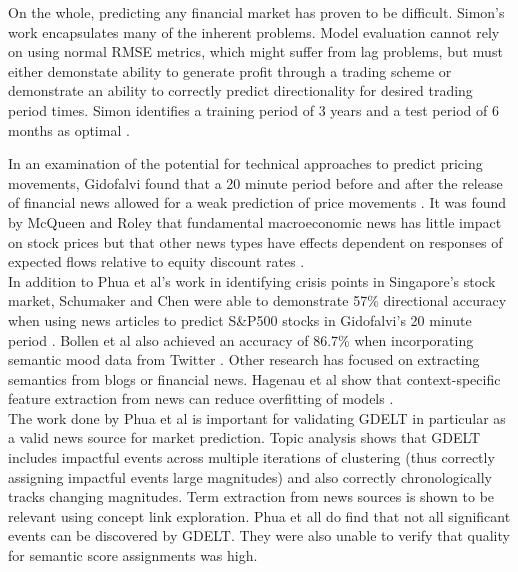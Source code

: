 On the whole, predicting any financial market has proven to be difficult. Simon's work encapsulates many of the inherent problems. Model evaluation cannot rely on using normal RMSE metrics, which might suffer from lag problems, but must either demonstate ability to generate profit through a trading scheme or demonstrate an ability to correctly predict directionality for desired trading period times. Simon identifies a training period of 3 years and a test period of 6 months as optimal \cite{forex_neuralnets}.

\noindent In an examination of the potential for technical approaches to predict pricing movements, Gidofalvi found that a 20 minute period before and after the release of financial news allowed for a weak prediction of price movements \cite{gidofalvi2001using}. It was found by McQueen and Roley that fundamental macroeconomic news has little impact on stock prices but that other news types have effects dependent on responses of expected flows relative to equity discount rates \cite{mcqueen1993stock}.\\

\noindent In addition to Phua et al's work in identifying crisis points in Singapore's stock market, Schumaker and Chen were able to demonstrate 57\% directional accuracy when using news articles to predict S\&P500 stocks in Gidofalvi's 20 minute period \cite{schumaker2009textual}. Bollen et al also achieved an accuracy of 86.7\% when incorporating semantic mood data from Twitter \cite{bollen2011twitter}. Other research has focused on extracting semantics from blogs or financial news. Hagenau et al show that context-specific feature extraction from news can reduce overfitting of models \cite{hagenau2012automated}.\\

\noindent The work done by Phua et al is important for validating GDELT in particular as a valid news source for market prediction. Topic analysis shows that GDELT includes impactful events across multiple iterations of clustering (thus correctly assigning impactful events large magnitudes) and also correctly chronologically tracks changing magnitudes. Term extraction from news sources is shown to be relevant using concept link exploration. Phua et all do find that not all significant events can be discovered by GDELT. They were also unable to verify that quality for semantic score assignments was high.